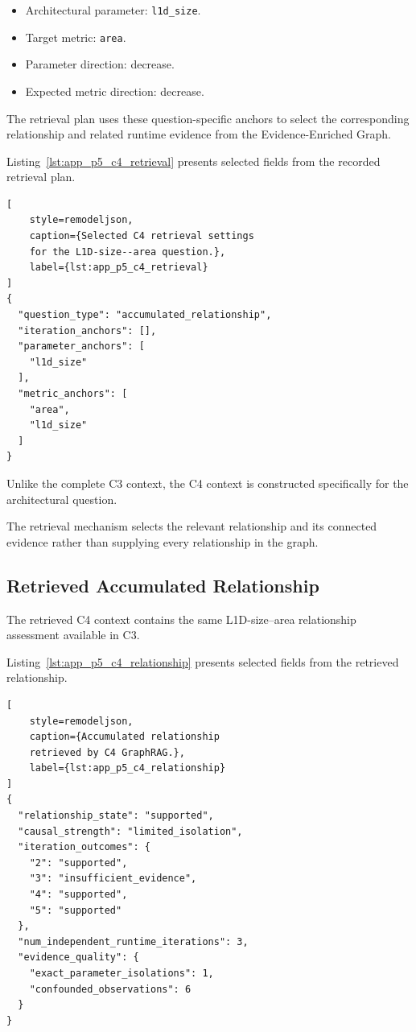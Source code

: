 \begin{itemize}
    \item Architectural parameter:
    \texttt{l1d\_size}.

    \item Target metric:
    \texttt{area}.

    \item Parameter direction:
    decrease.

    \item Expected metric direction:
    decrease.
\end{itemize}

The retrieval plan uses
these question-specific
anchors to select the
corresponding relationship
and related runtime evidence
from the Evidence-Enriched Graph.

Listing~\ref{lst:app_p5_c4_retrieval}
presents selected fields
from the recorded retrieval plan.

\begin{lstlisting}[
    style=remodeljson,
    caption={Selected C4 retrieval settings
    for the L1D-size--area question.},
    label={lst:app_p5_c4_retrieval}
]
{
  "question_type": "accumulated_relationship",
  "iteration_anchors": [],
  "parameter_anchors": [
    "l1d_size"
  ],
  "metric_anchors": [
    "area",
    "l1d_size"
  ]
}
\end{lstlisting}

Unlike the complete C3 context,
the C4 context is constructed
specifically for the
architectural question.

The retrieval mechanism
selects the relevant
relationship and its
connected evidence rather
than supplying every
relationship in the graph.


\subsection{Retrieved Accumulated Relationship}

The retrieved C4 context
contains the same
L1D-size--area relationship
assessment available in C3.

Listing~\ref{lst:app_p5_c4_relationship}
presents selected fields
from the retrieved relationship.

\begin{lstlisting}[
    style=remodeljson,
    caption={Accumulated relationship
    retrieved by C4 GraphRAG.},
    label={lst:app_p5_c4_relationship}
]
{
  "relationship_state": "supported",
  "causal_strength": "limited_isolation",
  "iteration_outcomes": {
    "2": "supported",
    "3": "insufficient_evidence",
    "4": "supported",
    "5": "supported"
  },
  "num_independent_runtime_iterations": 3,
  "evidence_quality": {
    "exact_parameter_isolations": 1,
    "confounded_observations": 6
  }
}
\end{lstlisting}

